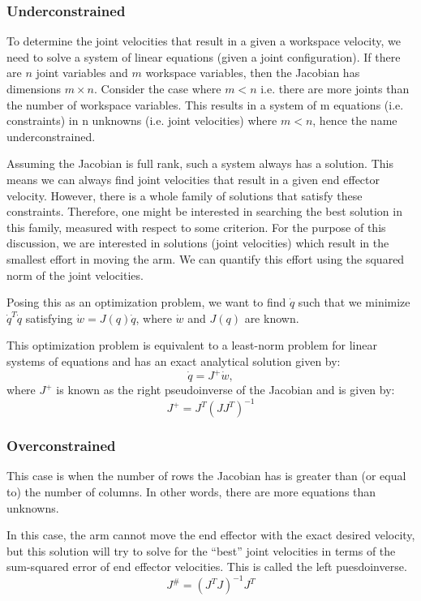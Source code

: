 \documentclass{16384_doc}
\begin{document}
\subsubsection{Underconstrained}
To determine the joint velocities that result in a given a workspace velocity, we need to solve a system of linear equations (given a joint configuration).   If there are $n$ joint variables and $m$ workspace variables, then the Jacobian has dimensions $m \times n$.  Consider the case where $m < n$ i.e. there are more joints than the number of workspace variables. This results in a system of m equations (i.e. constraints) in n unknowns (i.e. joint velocities) where $m < n$, hence the name underconstrained.

Assuming the Jacobian is full rank, such a system always has a solution. This means we can always find joint velocities that result in a given end effector velocity. However, there is a whole family of solutions that satisfy these constraints. Therefore, one might be interested in searching the best solution in this family, measured with respect to some criterion. For the purpose of this discussion, we are interested in solutions (joint velocities) which result in the smallest effort in moving the arm. We can quantify this effort using the squared norm of the joint velocities.

Posing this as an optimization problem, we want to find $\dot q$ such that we minimize $\dot q^T \dot q$ satisfying $\dot w = J(q) \dot q$, where $\dot w$ and $J(q)$ are known.

This optimization problem is equivalent to a least-norm problem for linear systems of equations and has an exact analytical solution given by:
\[
\dot q = J^+ \dot w,
\]
where $J^+$ is known as the right pseudoinverse of the Jacobian and is given by:
\[
J^+ = J^T(JJ^T)^{-1}
\]


\subsubsection{Overconstrained}
This case is when the number of rows the Jacobian has is greater than (or equal
to) the number of columns. In other words, there are more equations than unknowns.

In this case, the arm cannot move the end effector with the exact desired
velocity, but this solution will try to solve for the ``best'' joint velocities in
terms of the sum-squared error of end effector velocities. This is called the left puesdoinverse.
\[
J^\# = (J^TJ)^{-1}J^T
\]
\end{document}
